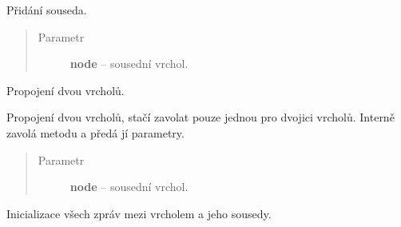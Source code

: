 \begin{fulllineitems}
\begin{fulllineitems}
\end{fulllineitems}


\begin{fulllineitems}
\label{alex.infer:alex.infer.factor.alex.infer.node.DiscreteVariableNode.add_neighbor}
Přidání souseda.
\begin{quote}\begin{description}
\item[{Parametr}] \leavevmode
\textbf{node} -- sousední vrchol.

\end{description}\end{quote}

\end{fulllineitems}


\begin{fulllineitems}
\label{alex.infer:alex.infer.factor.alex.infer.node.DiscreteVariableNode.connect}
Propojení dvou vrcholů.

Propojení dvou vrcholů, stačí zavolat pouze jednou pro dvojici vrcholů.
Interně zavolá metodu {\hyperref[alex.infer:alex.infer.factor.alex.infer.node.DiscreteVariableNode.add_neighbor]{}} a předá jí parametry.
\begin{quote}\begin{description}
\item[{Parametr}] \leavevmode
\textbf{node} -- sousední vrchol.

\end{description}\end{quote}

\end{fulllineitems}


\begin{fulllineitems}
\label{alex.infer:alex.infer.factor.alex.infer.node.DiscreteVariableNode.init_messages}
Inicializace všech zpráv mezi vrcholem a jeho sousedy.

\end{fulllineitems}


\end{fulllineitems}
